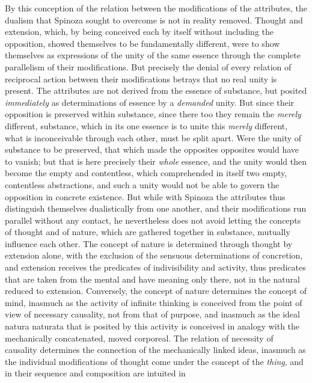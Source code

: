 By this conception of the relation between the modifications of the
attributes, the dualism that Spinoza sought to overcome is not in
reality removed. Thought and extension, which, by being conceived each
by itself without including the opposition, showed themselves to be
fundamentally different, were to show themselves as expressions of the
unity of the same essence through the complete parallelism of their
modifications. But precisely the denial of every relation of
reciprocal action between their modifications betrays that no real
unity is present. The attributes are not derived from the essence of
substance, but posited \emph{immediately} as determinations of essence
by a \emph{demanded} unity. But since their opposition is preserved
within substance, since there too they remain the \emph{merely}
different, substance, which in its one essence is to unite this
\emph{merely} different, what is inconceivable through each other,
must be split apart. Were the unity of substance to be preserved, that
which made the opposites opposites would have to vanish; but that is
here precisely their \emph{whole} essence, and the unity would then
become the empty and contentless, which comprehended in
itself two empty, contentless abstractions, and such a unity would not
be able to govern the opposition in concrete existence. But while with
Spinoza the attributes thus distinguish themselves dualistically from
one another, and their modifications run parallel without any contact,
he nevertheless does not avoid letting the concepts of thought and of
nature, which are gathered together in substance, mutually influence
each other. The concept of nature is determined through thought by
extension alone, with the exclusion of the sensuous determinations of
concretion, and extension receives the predicates of indivisibility
and activity, thus predicates that are taken from the mental and
have meaning only there, not in the natural reduced to extension.
Conversely, the concept of nature determines the concept of mind,
inasmuch as the activity of infinite thinking is conceived from the
point of view of necessary causality, not from that of purpose, and
inasmuch as the ideal natura naturata that is posited by this activity
is conceived in analogy with the mechanically concatenated, moved
corporeal. The relation of necessity of causality determines the
connection of the mechanically linked ideas, inasmuch as the
individual modifications of thought come under the concept of the
\emph{thing}, and in their sequence and composition are intuited in
